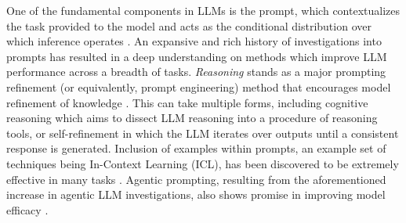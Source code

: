 One of the fundamental components in LLMs is the prompt, which contextualizes the task provided to the model and acts as the conditional distribution over which inference operates \cite{mei2025survey}. An expansive and rich history of investigations into prompts has resulted in a deep understanding on methods which improve LLM performance across a breadth of tasks. \textit{Reasoning} stands as a major prompting refinement (or equivalently, prompt engineering) method that encourages model refinement of knowledge \cite{munkhbat2025self,agarwal2023kitlm,zhou2022least,huang2023language,zhang2022automatic,shi2022language}. This can take multiple forms, including cognitive reasoning \cite{kramer2024unlocking} which aims to dissect LLM reasoning into a procedure of reasoning tools, or self-refinement \cite{madaan2023self,shinn2023reflexion,zhou2024isr} in which the LLM iterates over outputs until a consistent response is generated. Inclusion of examples within prompts, an example set of techniques being In-Context Learning (ICL), has been discovered to be extremely effective in many tasks \cite{dong2024survey}. Agentic prompting, resulting from the aforementioned increase in agentic LLM investigations, also shows promise in improving model efficacy \cite{yue2024fragrel,chen2022program}.

